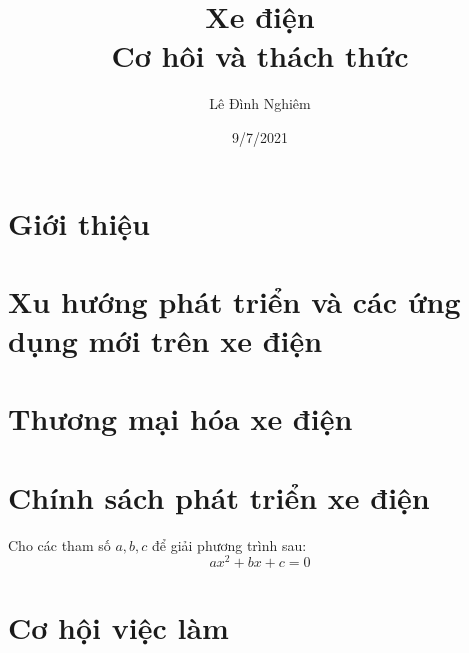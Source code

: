 \documentclass{article}
\title{\textbf{Xe điện\\
		Cơ hôi và thách thức}}
\author{Lê Đình Nghiêm}
\date{9/7/2021}
\begin{document}
\maketitle
	\section{Giới thiệu}
	\section{Xu hướng phát triển và các ứng dụng mới trên xe điện}
	\section{Thương mại hóa xe điện}
	\section{Chính sách phát triển xe điện}
	Cho các tham số $a,b,c$ để giải phương trình sau:
	\begin{equation}
		ax^{2}+bx+c=0
	\end{equation}
	\section{Cơ hội việc làm}
\end{document}
